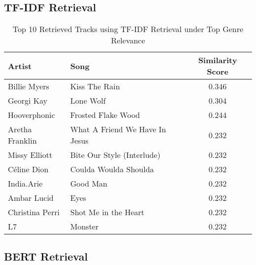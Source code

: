 \documentclass[sigconf]{acmart}
\begin{document}
\subsection{TF-IDF Retrieval}


\begin{table}[H]
    \centering
    \caption{Top 10 Retrieved Tracks using TF-IDF Retrieval under Top Genre Relevance}
    \label{tab:retrieved_tfidf_top_genre_specific}
    \footnotesize
    \begin{tabular}{l l c}
        \toprule
        \textbf{Artist} & \textbf{Song} & \textbf{Similarity Score} \\
        \midrule
        Billie Myers & Kiss The Rain & 0.346 \\
        Georgi Kay & Lone Wolf & 0.304 \\
        Hooverphonic & Frosted Flake Wood & 0.244 \\
        Aretha Franklin & What A Friend We Have In Jesus & 0.232 \\
        Missy Elliott & Bite Our Style (Interlude) & 0.232 \\
        Céline Dion & Coulda Woulda Shoulda & 0.232 \\
        India.Arie & Good Man & 0.232 \\
        Ambar Lucid & Eyes & 0.232 \\
        Christina Perri & Shot Me in the Heart & 0.232 \\
        L7 & Monster & 0.232 \\
        \bottomrule
    \end{tabular}
\end{table}

\subsection{BERT Retrieval}

\end{document}

